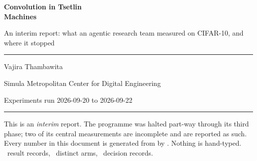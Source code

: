 \documentclass[11pt,a4paper]{article}
\begin{document}
\begin{titlepage}
\vspace*{18mm}
{\sffamily\bfseries\color{ttdeep}\Huge Convolution in Tsetlin\\[2mm] Machines\par}
\vspace{6mm}
{\sffamily\LARGE\color{ttorange} An interim report: what an agentic research team
measured on CIFAR-10, and where it stopped\par}
\vspace{10mm}
{\color{ttrule}\rule{\textwidth}{1.1pt}}
\vspace{6mm}

{\sffamily\large Vajira Thambawita\par}
{\sffamily\color{ttgray} Simula Metropolitan Center for Digital Engineering\par}
\vspace{3mm}
{\sffamily\color{ttgray} Experiments run 2026-09-20 to 2026-09-22\par}
\vspace{14mm}

\begin{ttcallout}[Summary]

\end{ttcallout}

\vfill
{\color{ttrule}\rule{\textwidth}{0.6pt}}
{\sffamily\footnotesize\color{ttgray} This is an \emph{interim} report. The programme was halted
part-way through its third phase; two of its central measurements are incomplete and are reported as
such. Every number in this document is generated from  by
. Nothing is hand-typed. \NResults\ result records, \NArms\ distinct arms,
\NDecisions\ decision records.\par}
\end{titlepage}

{\sffamily\footnotesize
 \setlength{\parskip}{0pt}
 \renewcommand{\contentsname}{\textcolor{ttdeep}{Contents}}
 \tableofcontents}
\clearpage
{}










\end{document}
